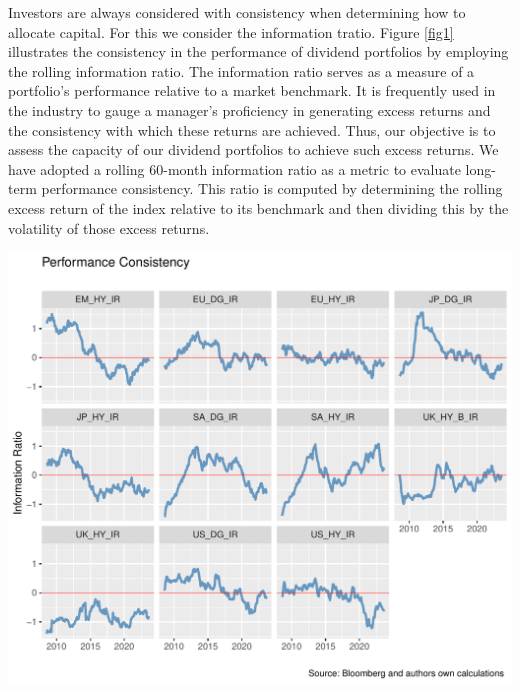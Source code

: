 \documentclass[12pt,preprint, authoryear]{elsarticle}
\let\origfigure\figure
\let\endorigfigure\endfigure
\renewenvironment{figure}[1][2] {
    \expandafter\origfigure\expandafter[H]
} {
    \endorigfigure
}
\numberwithin{equation}{section}
\numberwithin{figure}{section}
\numberwithin{table}{section}
\begin{document}
Investors are always considered with consistency when determining how to
allocate capital. For this we consider the information tratio. Figure
\ref{fig1} illustrates the consistency in the performance of dividend
portfolios by employing the rolling information ratio. The information
ratio serves as a measure of a portfolio's performance relative to a
market benchmark. It is frequently used in the industry to gauge a
manager's proficiency in generating excess returns and the consistency
with which these returns are achieved. Thus, our objective is to assess
the capacity of our dividend portfolios to achieve such excess returns.
We have adopted a rolling 60-month information ratio as a metric to
evaluate long-term performance consistency. This ratio is computed by
determining the rolling excess return of the index relative to its
benchmark and then dividing this by the volatility of those excess
returns.

\begin{figure}[H]

\includegraphics{Much_Ado_About_Dividends_files/figure-latex/unnamed-chunk-1-1} \hfill{}

\caption{Rolling 3 Year Returns \label{fig1}}\label{fig:unnamed-chunk-1}
\end{figure}
\end{document}
